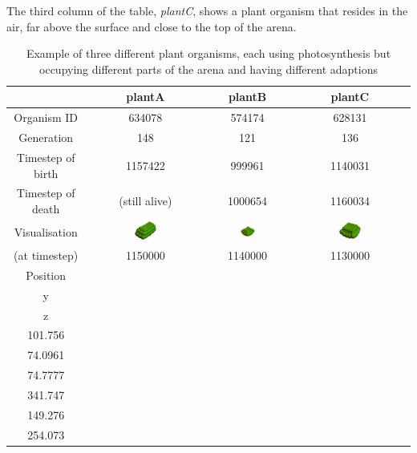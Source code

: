 The third column of the table, \emph{plantC}, shows a plant organism that resides in the air, far above the surface and close to the top of the arena.
\begin{table}[H]
 \begin{tabular}{ c || c | c | c |} 
    & plantA & plantB & plantC \\ [0.5ex] \hline \hline
     Organism ID & 634078 & 574174 & 628131 \\ \hline
     Generation & 148 & 121 & 136 \\ \hline
     Timestep of birth & 1157422 & 999961 & 1140031 \\ \hline
     Timestep of death & (still alive) & 1000654 & 1160034 \\ \hline
     Visualisation & 
        \includegraphics[width=0.2\textwidth]{figure/3orgs/plantA} &
        \includegraphics[width=0.2\textwidth]{figure/3orgs/plantB} &
        \includegraphics[width=0.2\textwidth]{figure/3orgs/plantC} \\
     (at timestep) & 1150000 & 1140000 & 1130000 \\ \hline
     Position \(\left(\begin{array}{l} x\\y\\z\end{array}\right)\) & 
        \(\left(\begin{array}{l} 172.198\\101.756\\74.0961 \end{array}\right)\) &
        \(\left(\begin{array}{l} 108.528\\ 74.7777\\ 341.747\end{array}\right)\) &
        \(\left(\begin{array}{l} 39.015\\ 149.276\\ 254.073\end{array}\right)\)\\ \hline
 \end{tabular}
\caption{Example of three different plant organisms, each using photosynthesis but occupying different parts of the arena and having different adaptions}
\label{tab:3plants}
\end{table}

